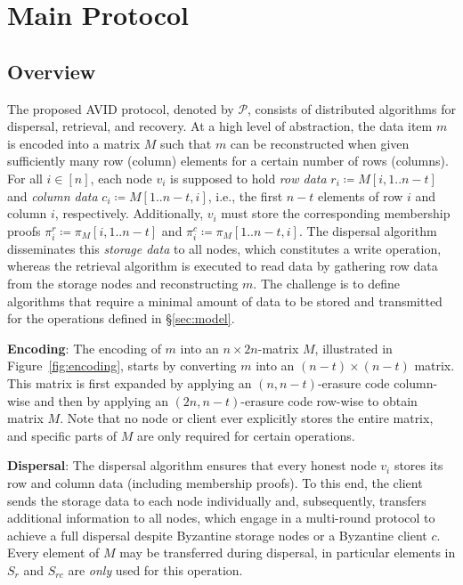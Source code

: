 \documentclass[sigconf,screen]{acmart}
\begin{document}

\section{Main Protocol}
\label{sec:avid}

\subsection{Overview}

The proposed AVID protocol, denoted by $\mathcal{P}$, consists of distributed algorithms for dispersal, retrieval, and recovery.
At a high level of abstraction, the data item $m$ is encoded into a matrix $M$ such that $m$ can be reconstructed when given sufficiently many row (column) elements for a certain number of rows (columns).
For all $i \in [n]$, each node $v_i$ is supposed to hold \emph{row data} $r_i \coloneqq M[i,1..n-t]$ and \emph{column data} $c_i \coloneqq M[1..n-t,i]$, i.e., the first $n-t$ elements of row $i$ and column $i$, respectively. Additionally, $v_i$ must store the corresponding membership proofs $\pi_i^r \coloneq \pi_M[i,1..n-t]$ and $\pi_i^c \coloneq \pi_M[1..n-t,i]$.
The dispersal algorithm disseminates this \emph{storage data} to all nodes, which constitutes a write operation, whereas the retrieval algorithm is executed to read data by gathering row data from the storage nodes and reconstructing $m$. The challenge is to define algorithms that require a minimal amount of data to be stored and transmitted for the operations defined in \S\ref{sec:model}.

\textbf{Encoding}:
The encoding of $m$ into an $n \times 2n$-matrix $M$, illustrated in Figure~\ref{fig:encoding}, starts by converting $m$ into an $(n-t) \times (n-t)$ matrix. This matrix is first expanded by applying an  $(n, n-t)$-erasure code column-wise and then by applying an $(2n, n-t)$-erasure code row-wise to obtain matrix $M$. %
Note that no node or client ever explicitly stores the entire matrix, and specific parts of $M$ are only required for certain operations.

\textbf{Dispersal}:
The dispersal algorithm ensures that every honest node $v_i$ stores its row and column data (including membership proofs).
To this end, the client sends the storage data to each node individually and, subsequently, transfers additional information to all nodes, which engage in a multi-round protocol to achieve a full dispersal despite Byzantine storage nodes or a Byzantine client $c$. Every element of $M$ may be transferred during dispersal, in particular elements in $S_{r}$ and $S_{rc}$ are \emph{only} used for this operation.
\end{document}
